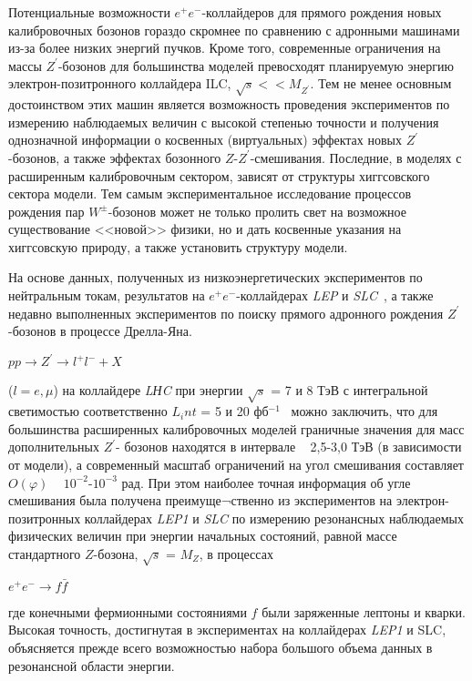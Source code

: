 Потенциальные возможности $e^+$$e^-$-коллайдеров для прямого рождения новых калибровочных бозонов гораздо скромнее по сравнению с адронными машинами из-за более низких энергий пучков. Кроме того, современные ограничения на массы $Z^\prime$-бозонов для большинства моделей превосходят планируемую энергию электрон-позитронного коллайдера ILC, $\sqrt{s}<< M_{Z^\prime}$. Тем не менее основным достоинством этих машин является возможность проведения экспериментов по измерению наблюдаемых величин с высокой степенью точности и получения однозначной информации о косвенных (виртуальных) эффектах новых $Z^\prime$-бозонов, а также эффектах бозонного $Z$-$Z^\prime$-смешивания. Последние, в моделях с расширенным калибровочным сектором, зависят от структуры хиггсовского сектора модели. Тем самым экспериментальное исследование процессов рождения пар $W^±$-бозонов может не только пролить свет на возможное существование <<новой>> физики, но и дать косвенные указания на хиггсовскую природу, а также установить структуру модели.

На основе данных, полученных из низкоэнергетических экспериментов по нейтральным токам, результатов на $e^+e^-$-коллайдерах \textit{LEP} и \textit{SLC}~\cite{Bobovnikov:2016}, а также недавно выполненных экспериментов по поиску прямого адронного рождения $Z^\prime$-бозонов в процессе Дрелла-Яна.\\
\begin{center}
	$pp \rightarrow Z^\prime \rightarrow l^+l^- + X$
\end{center}
($l=e,\mu$) на коллайдере \textit{LНC} при энергии $\sqrt{s}$ = 7 и 8 ТэВ с интегральной светимостью соответственно $L_int$ = 5 и 20 фб${}^{-1}$~\cite{Bobovnikov:2016} можно заключить, что для большинства расширенных калибровочных моделей граничные значения для масс дополнительных $Z^\prime$- бозонов находятся в интервале ~ 2,5-3,0 ТэВ (в зависимости от модели), а современный масштаб ограничений на угол смешивания составляет $O(\varphi )$ ~ ${10}^{-2}$-${10}^{-3}$ рад. При этом наиболее точная информация об угле смешивания была получена преимуще¬ственно из экспериментов на электрон-позитронных коллайдерах \textit{LEP1} и \textit{SLC} по измерению резонансных наблюдаемых физических величин при энергии начальных состояний, равной массе стандартного $Z$-бозона, $\sqrt{s}$ = $M_Z$, в процессах\\
\begin{center}
	$e^+e^- \rightarrow f\bar{f}$
\end{center}

где конечными фермионными состояниями $f$ были заряженные лептоны и кварки. Высокая точность, достигнутая в экспериментах на коллайдерах \textit{LEP1} и SLC, объясняется прежде всего возможностью набора большого объема данных в резонансной области энергии.

